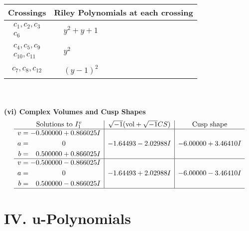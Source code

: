 \documentclass[1p]{elsarticle_modified}
\theoremstyle{definition}
\newcommand{\I}{\sqrt{-1}}
\begin{document}
\begin{tabular}{m{50pt}|m{274pt}}
Crossings & \hspace{64pt}Riley Polynomials at each crossing \\
\hline $$\begin{aligned}c_{1},c_{2},c_{3}\\c_{6}\end{aligned}$$&$\begin{aligned}
&y^2+y+1
\end{aligned}$\\
\hline $$\begin{aligned}c_{4},c_{5},c_{9}\\c_{10},c_{11}\end{aligned}$$&$\begin{aligned}
&y^2
\end{aligned}$\\
\hline $$\begin{aligned}c_{7},c_{8},c_{12}\end{aligned}$$&$\begin{aligned}
&(y-1)^2
\end{aligned}$\\
\hline
\end{tabular}\\~\\
\newpage\flushleft \textbf{(vi) Complex Volumes and Cusp Shapes}
$$\begin{array}{c|c|c}  
\text{Solutions to }I^v_{1}& \I (\text{vol} + \sqrt{-1}CS) & \text{Cusp shape}\\
 \hline 
\begin{aligned}
v &= -0.500000 + 0.866025 I \\
a &= \phantom{-0.000000 } 0 \\
b &= \phantom{-}0.500000 + 0.866025 I\end{aligned}
 & -1.64493 - 2.02988 I & -6.00000 + 3.46410 I \\ \hline\begin{aligned}
v &= -0.500000 - 0.866025 I \\
a &= \phantom{-0.000000 } 0 \\
b &= \phantom{-}0.500000 - 0.866025 I\end{aligned}
 & -1.64493 + 2.02988 I & -6.00000 - 3.46410 I\\
 \hline 
 \end{array}$$\newpage
\newpage\renewcommand{\arraystretch}{1}
\centering \section*{ IV. u-Polynomials}
\end{document}

